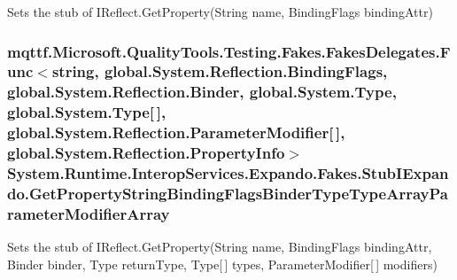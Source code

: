 Sets the stub of I\-Reflect.\-Get\-Property(\-String name, Binding\-Flags binding\-Attr)

\hypertarget{class_system_1_1_runtime_1_1_interop_services_1_1_expando_1_1_fakes_1_1_stub_i_expando_adb5cc60aa5cdeace1c041cc6c387150a}{
\subsubsection[{Get\-Property\-String\-Binding\-Flags\-Binder\-Type\-Type\-Array\-Parameter\-Modifier\-Array}]{\setlength{\rightskip}{0pt plus 5cm}mqttf.\-Microsoft.\-Quality\-Tools.\-Testing.\-Fakes.\-Fakes\-Delegates.\-Func$<$string, global.\-System.\-Reflection.\-Binding\-Flags, global.\-System.\-Reflection.\-Binder, global.\-System.\-Type, global.\-System.\-Type\mbox{[}$\,$\mbox{]}, global.\-System.\-Reflection.\-Parameter\-Modifier\mbox{[}$\,$\mbox{]}, global.\-System.\-Reflection.\-Property\-Info$>$ System.\-Runtime.\-Interop\-Services.\-Expando.\-Fakes.\-Stub\-I\-Expando.\-Get\-Property\-String\-Binding\-Flags\-Binder\-Type\-Type\-Array\-Parameter\-Modifier\-Array}}\label{class_system_1_1_runtime_1_1_interop_services_1_1_expando_1_1_fakes_1_1_stub_i_expando_adb5cc60aa5cdeace1c041cc6c387150a}


Sets the stub of I\-Reflect.\-Get\-Property(\-String name, Binding\-Flags binding\-Attr, Binder binder, Type return\-Type, Type\mbox{[}$\,$\mbox{]} types, Parameter\-Modifier\mbox{[}$\,$\mbox{]} modifiers)

